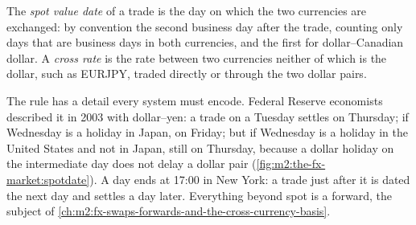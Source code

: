 \begin{definition}\label{def:m2:the-fx-market:spot}
The \emph{spot value date} of a trade is the day on which
the two currencies are exchanged: by convention the second business day after
the trade, counting only days that are business days in both currencies, and
the first for dollar--Canadian dollar. A \emph{cross rate} is
the rate between two currencies neither of which is the dollar, such as EURJPY,
traded directly or through the two dollar pairs.
\end{definition}

The rule has a detail every system must encode. Federal Reserve economists
described it in 2003 with dollar--yen: a trade on a Tuesday settles on
Thursday; if Wednesday is a holiday in Japan, on Friday; but if Wednesday is a
holiday in the United States and not in Japan, still on Thursday, because a
dollar holiday on the intermediate day does not delay a dollar pair
(\cref{fig:m2:the-fx-market:spotdate}). A day ends at 17:00 in New York: a
trade just after it is dated the next day and settles a day later. Everything
beyond spot is a forward, the subject of \cref{ch:m2:fx-swaps-forwards-and-the-cross-currency-basis}.

\begin{omfigure}
\centering
{}

\label{fig:m2:the-fx-market:spotdate}
\end{omfigure}

